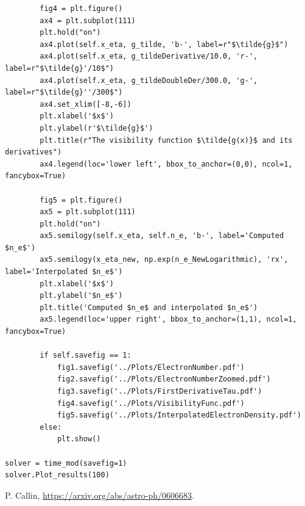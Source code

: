 \documentclass[12pt]{article}
\begin{document}
\begin{lstlisting}
		fig4 = plt.figure()
		ax4 = plt.subplot(111)
		plt.hold("on")
		ax4.plot(self.x_eta, g_tilde, 'b-', label=r"$\tilde{g}$")
		ax4.plot(self.x_eta, g_tildeDerivative/10.0, 'r-', label=r"$\tilde{g}'/10$")
		ax4.plot(self.x_eta, g_tildeDoubleDer/300.0, 'g-', label=r"$\tilde{g}''/300$")
		ax4.set_xlim([-8,-6])
		plt.xlabel('$x$')
		plt.ylabel(r'$\tilde{g}$')
		plt.title(r"The visibility function $\tilde{g(x)}$ and its derivatives")
		ax4.legend(loc='lower left', bbox_to_anchor=(0,0), ncol=1, fancybox=True)
		
		fig5 = plt.figure()
		ax5 = plt.subplot(111)
		plt.hold("on")
		ax5.semilogy(self.x_eta, self.n_e, 'b-', label='Computed $n_e$')
		ax5.semilogy(x_eta_new, np.exp(n_e_NewLogarithmic), 'rx', label='Interpolated $n_e$')
		plt.xlabel('$x$')
		plt.ylabel('$n_e$')		
		plt.title('Computed $n_e$ and interpolated $n_e$')		
		ax5.legend(loc='upper right', bbox_to_anchor=(1,1), ncol=1, fancybox=True)

		if self.savefig == 1:
			fig1.savefig('../Plots/ElectronNumber.pdf')
			fig2.savefig('../Plots/ElectronNumberZoomed.pdf')
			fig3.savefig('../Plots/FirstDerivativeTau.pdf')
			fig4.savefig('../Plots/VisibilityFunc.pdf')
			fig5.savefig('../Plots/InterpolatedElectronDensity.pdf')
		else:
			plt.show()

solver = time_mod(savefig=1)
solver.Plot_results(100)
\end{lstlisting}

\begin{thebibliography}{1}
     P. Callin, \url{https://arxiv.org/abs/astro-ph/0606683}.
\end{thebibliography}
\end{document}
